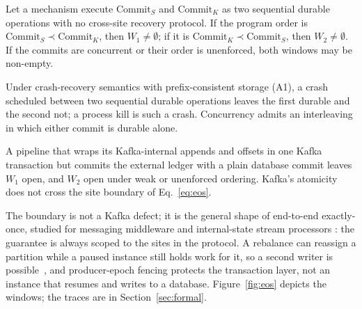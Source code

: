\begin{lemma}
\label{lem:windows}
Let a mechanism execute $\mathrm{Commit}_{S}$ and $\mathrm{Commit}_{K}$ as two sequential durable
operations with no cross-site recovery protocol. If the program order is
$\mathrm{Commit}_{S}\prec\mathrm{Commit}_{K}$, then $W_1\neq\emptyset$; if it is
$\mathrm{Commit}_{K}\prec\mathrm{Commit}_{S}$, then $W_2\neq\emptyset$. If the commits are
concurrent or their order is unenforced, both windows may be non-empty.
\end{lemma}

\begin{proofsketch}
Under crash-recovery semantics with prefix-consistent storage (A1), a crash scheduled between two
sequential durable operations leaves the first durable and the second not; a process kill is
such a crash. Concurrency admits an interleaving in which either commit is durable alone.
\end{proofsketch}

\begin{corollary}
\label{cor:eosgap}
A pipeline that wraps its Kafka-internal appends and offsets in one Kafka transaction but commits
the external ledger with a plain database commit leaves $W_1$ open, and $W_2$ open under weak or
unenforced ordering. Kafka's atomicity does not cross the site boundary of Eq.~\eqref{eq:eos}.
\end{corollary}

The boundary is not a Kafka defect; it is the general shape of end-to-end exactly-once, studied
for messaging middleware \cite{eosmsg2001,eosmid2012,eoscorba1999} and internal-state stream
processors \cite{millwheel2013,flink2017,dataflow2015}: the guarantee is always scoped to the
sites in the protocol. A rebalance can reassign a partition while a paused instance still holds
work for it, so a second writer is possible~\cite{kip429}, and producer-epoch fencing protects
the transaction layer, not an instance that resumes and writes to a database.
Figure~\ref{fig:eos} depicts the windows; the traces are in Section~\ref{sec:formal}.

